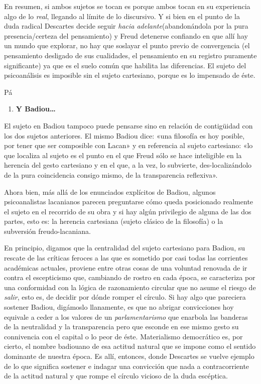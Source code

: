 En resumen, si ambos sujetos se tocan es porque ambos tocan en su experiencia algo de lo \emph{real}, llegando al límite de lo discursivo. Y si bien en el punto de la duda radical Descartes decide seguir \emph{hacia adelante}(abandonándola por la pura presencia/certeza del pensamiento) y Freud detenerse confiando en que allí hay un mundo que explorar, no hay que soslayar el punto previo de convergencia (el pensamiento desligado de sus cualidades, el pensamiento en su registro puramente significante) ya que es el suelo común que habilita las diferencias. El sujeto del psicoanálisis es imposible sin el sujeto cartesiano, porque es lo impensado de éste.

Pá

\begin{enumerate}
\def\labelenumi{\arabic{enumi}.}
\item
  \textbf{Y Badiou\ldots{}}
\end{enumerate}

El sujeto en Badiou tampoco puede pensarse sino en relación de contigüidad con los dos sujetos anteriores. El mismo Badiou dice: «una filosofía es hoy posible, por tener que ser composible con Lacan» y en referencia al sujeto cartesiano: «lo que localiza al sujeto es el punto en el que Freud sólo se hace inteligible en la herencia del gesto cartesiano y en el que, a la vez, lo subvierte, des-localizándolo de la pura coincidencia consigo mismo, de la transparencia reflexiva».

Ahora bien, más allá de los enunciados explícitos de Badiou, algunos psicoanalistas lacanianos parecen preguntarse cómo queda posicionado realmente el sujeto en el recorrido de su obra y si hay algún privilegio de alguna de las dos partes, esto es: la herencia cartesiana (sujeto clásico de la filosofía) o la subversión freudo-lacaniana.

En principio, digamos que la centralidad del sujeto cartesiano para Badiou, su rescate de las críticas feroces a las que es sometido por casi todas las corrientes académicas actuales, proviene entre otras cosas de una voluntad renovada de ir contra el escepticismo que, cambiando de rostro en cada época, se caracteriza por una conformidad con la lógica de razonamiento circular que no asume el riesgo de \emph{salir}, esto es, de decidir por dónde romper el círculo. Si hay algo que pareciera sostener Badiou, digámoslo llanamente, es que no abrigar convicciones hoy equivale a ceder a los valores de un \emph{parlamentarismo} que enarbola las banderas de la neutralidad y la transparencia pero que esconde en ese mismo gesto su connivencia con el capital o lo peor de éste. Materialismo democrático es, por cierto, el nombre badiouano de esa actitud natural que se impone como el sentido dominante de nuestra época. Es allí, entonces, donde Descartes se vuelve ejemplo de lo que significa sostener e indagar una convicción que nada a contracorriente de la actitud natural y que rompe el círculo vicioso de la duda escéptica.

